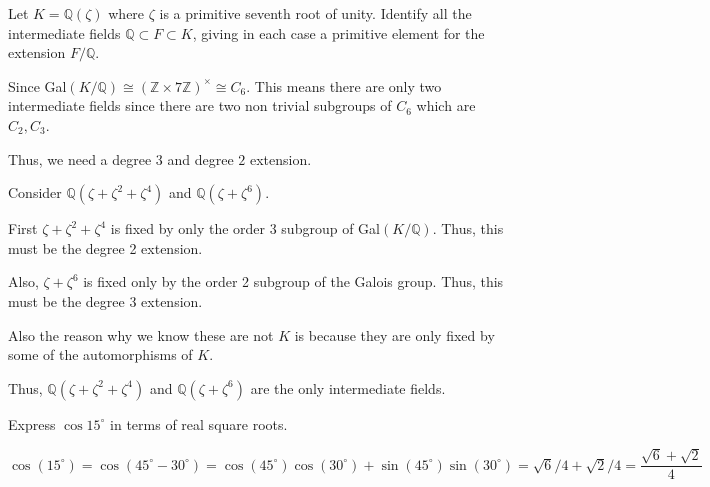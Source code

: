 \documentclass[12pt, letterpaper]{article}
\newcommand{\Q}{\mathbb{Q}}
\newcommand{\Z}{\mathbb{Z}}
\begin{document}
\begin{problem}{}
    Let $K=\Q(\zeta)$ where $\zeta$ is a primitive seventh root of unity. Identify all the intermediate fields $\Q \subset F \subset K$, giving in each case a primitive element for the extension $F/\Q$. 
\end{problem}
\begin{problemproof}
    Since Gal$(K/\Q) \cong (\Z \times 7\Z)^\times \cong C_6$. This means there are only two intermediate fields since there are two non trivial subgroups of $C_6$ which are $C_2,C_3$.

    Thus, we need a degree $3$ and degree $2$ extension.

    Consider $\Q(\zeta + \zeta^{2} + \zeta^4)$ and $\Q(\zeta + \zeta^6)$.

    First $\zeta + \zeta^{2} + \zeta^4$ is fixed by only the order 3 subgroup of Gal$(K/\Q)$. Thus, this must be the degree 2 extension.

    Also, $\zeta + \zeta^6$ is fixed only by the order 2 subgroup of the Galois group. Thus, this must be the degree 3 extension.

    Also the reason why we know these are not $K$ is because they are only fixed by some of the automorphisms of $K$.

    Thus, $\Q(\zeta + \zeta^{2} + \zeta^4)$ and $\Q(\zeta + \zeta^6)$ are the only intermediate fields.
\end{problemproof}

\begin{problem}{}
    Express $\cos{15^\circ}$ in terms of real square roots.
\end{problem}
\begin{problemproof}
    $\cos(15^\circ)= \cos(45^\circ - 30^\circ)=\cos(45^\circ)\cos(30^\circ)+\sin(45^\circ)\sin(30^\circ)=\sqrt{6}/4+\sqrt{2}/4=\dfrac{\sqrt{6}+\sqrt{2}}{4}$
\end{problemproof}
\end{document}
